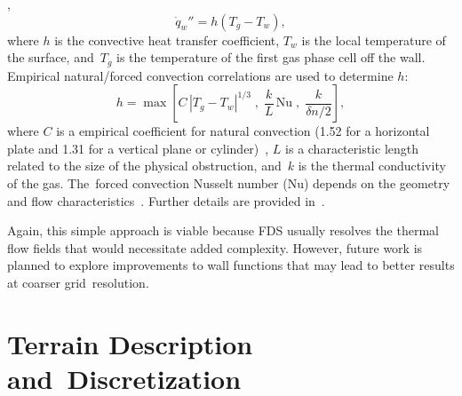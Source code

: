\documentclass[atmosphere,article,accept,moreauthors,pdftex]{Definitions/mdpi}
\begin{document}
,
\begin{equation}
\dot{q}_w'' = h (T_g - T_w),
\end{equation}
where $h$ is the convective heat transfer coefficient, $T_w$ is the local temperature of the surface, and~$T_g$ is the temperature of the first gas phase cell off the wall.  Empirical natural/forced convection correlations are used to determine $h$:
\begin{equation}
h = \max \left[C\, |T_g-T_w|^{1/3} \; , \;
\frac{k}{L} \, \mathrm{Nu} \; , \;
\frac{k}{\delta n/2} \right],
\label{eq:qconv}
\end{equation}
where $C$ is a empirical coefficient for natural convection (1.52 for a horizontal plate and 1.31 for a vertical plane or cylinder)~\cite{Holman:1}, $L$ is a characteristic length related to the size of the physical obstruction, and~$k$ is the thermal conductivity of the gas. The~forced convection Nusselt number (Nu) depends on the geometry and flow characteristics~\cite{Holman:1,Incropera:1}.  Further details are provided in~\cite{FDS_Tech_Guide}.

Again, this simple approach is viable because FDS usually resolves the thermal flow fields that would necessitate added complexity.  However, future work is planned to explore improvements to wall functions that may lead to better results at coarser grid~resolution.


\section{Terrain Description and~Discretization} \label{sec:terraindisc}
\end{document}
